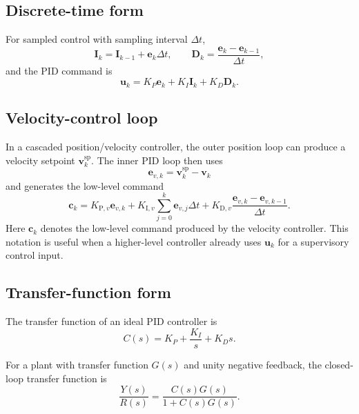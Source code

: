 \documentclass[a4paper]{article}
\begin{document}
   \subsection{Discrete-time form}
      For sampled control with sampling interval $\Delta t$,
      \[
         \mathbf{I}_k
         =
         \mathbf{I}_{k-1}
         +
         \mathbf{e}_k\Delta t,
         \qquad
         \mathbf{D}_k
         =
         \frac{\mathbf{e}_k-\mathbf{e}_{k-1}}{\Delta t},
      \]
      and the PID command is
      \[
         \mathbf{u}_k
         =
         K_P\mathbf{e}_k
         +
         K_I\mathbf{I}_k
         +
         K_D\mathbf{D}_k.
      \]

   \subsection{Velocity-control loop}
      In a cascaded position/velocity controller, the outer position loop can produce a velocity setpoint $\mathbf{v}^{\mathrm{sp}}_k$. The inner PID loop then uses
      \[
         \mathbf{e}_{v,k}
         =
         \mathbf{v}^{\mathrm{sp}}_k-\mathbf{v}_k
      \]
      and generates the low-level command
      \[
         \mathbf{c}_k
         =
         K_{\mathrm{P},v}\mathbf{e}_{v,k}
         +
         K_{\mathrm{I},v}
         \sum_{j=0}^{k}\mathbf{e}_{v,j}\Delta t
         +
         K_{\mathrm{D},v}
         \frac{\mathbf{e}_{v,k}-\mathbf{e}_{v,k-1}}{\Delta t}.
      \]
      Here $\mathbf{c}_k$ denotes the low-level command produced by the velocity controller. This notation is useful when a higher-level controller already uses $\mathbf{u}_k$ for a supervisory control input.

   \subsection{Transfer-function form}
      The transfer function of an ideal PID controller is
      \[
         C(s)
         =
         K_P
         +
         \frac{K_I}{s}
         +
         K_D s.
      \]

      For a plant with transfer function $G(s)$ and unity negative feedback, the closed-loop transfer function is
      \[
         \frac{Y(s)}{R(s)}
         =
         \frac{C(s)G(s)}
              {1+C(s)G(s)}.
      \]
\end{document}
